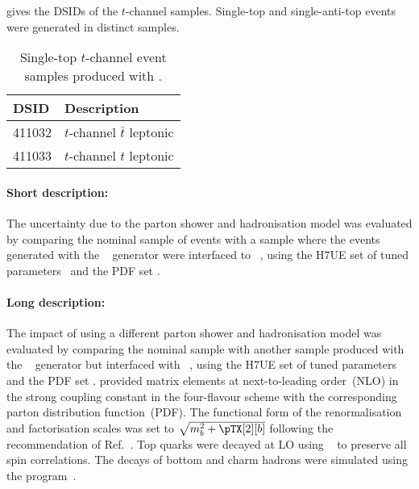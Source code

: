  gives the DSIDs of the $t$-channel \POWHER[7] samples.
Single-top and single-anti-top events were generated in distinct samples.

\begin{table}[htbp]
  \caption{Single-top $t$-channel event samples produced with \POWHER[7].}%
  \label{tab:tchan_PH7}
  \centering
  \begin{tabular}{l l}
    \toprule
    DSID & Description \\
    \midrule
    411032 & $t$-channel $\bar t$ leptonic \\
    411033 & $t$-channel $t$ leptonic \\
    \bottomrule
  \end{tabular}
\end{table}

\paragraph{Short description:}

The uncertainty due to the parton shower and hadronisation model was
evaluated by comparing the nominal sample of events with a sample where
the events generated with the
\POWHEGBOX[v2]~\cite{Frederix:2012dh,Nason:2004rx,Frixione:2007vw,Alioli:2010xd}
generator were interfaced to
\HERWIG[7.04]~\cite{Bahr:2008pv,Bellm:2015jjp}, using the H7UE set
of tuned parameters~\cite{Bellm:2015jjp} and the \MMHT[lo] PDF set
\cite{Harland-Lang:2014zoa}.


\paragraph{Long description:}

The impact of using a different parton shower and hadronisation model was evaluated by comparing the nominal sample
with another sample produced with the \POWHEGBOX[v2]~\cite{Frederix:2012dh,Nason:2004rx,Frixione:2007vw,Alioli:2010xd}
generator but interfaced with \HERWIG[7.04]~\cite{Bahr:2008pv,Bellm:2015jjp}, using the H7UE set of
tuned parameters~\cite{Bellm:2015jjp} and the \MMHT[lo] PDF set \cite{Harland-Lang:2014zoa}.
\POWHEGBOX provided matrix elements at next-to-leading order~(NLO) in the strong coupling constant \alphas
in the four-flavour scheme with the corresponding \NNPDF[3.0nlo]~\cite{Ball:2014uwa} parton distribution function~(PDF).
The functional form of the renormalisation and factorisation scales was set to $\sqrt{m_b^2 + \pTX[2][b]}$
following the recommendation of Ref.~\cite{Frederix:2012dh}.
Top quarks were decayed at LO using \MADSPIN~\cite{Frixione:2007zp,Artoisenet:2012st} to preserve all spin correlations.
The decays of bottom and charm hadrons were simulated using the \EVTGEN[1.6.0] program~\cite{Lange:2001uf}.


